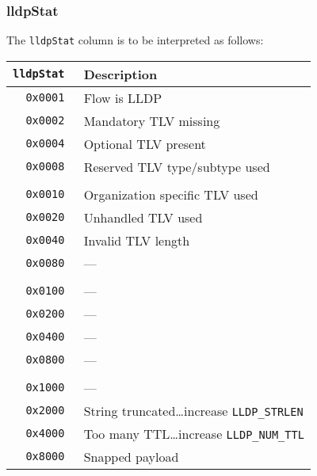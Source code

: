 \documentclass[documentation]{subfiles}
\begin{document}
\subsubsection{lldpStat}\label{lldpStat}
The {\tt lldpStat} column is to be interpreted as follows:
\begin{longtable}{>{\tt}rl}
    \toprule
    {\bf lldpStat} & {\bf Description}\\
    \midrule\endhead%
    0x0001 & Flow is LLDP\\
    0x0002 & Mandatory TLV missing\\
    0x0004 & Optional TLV present\\
    0x0008 & Reserved TLV type/subtype used\\
    \\
    0x0010 & Organization specific TLV used\\
    0x0020 & Unhandled TLV used\\
    0x0040 & Invalid TLV length\\
    0x0080 & ---\\
    \\
    0x0100 & ---\\
    0x0200 & ---\\
    0x0400 & ---\\
    0x0800 & ---\\
    \\
    0x1000 & ---\\
    0x2000 & String truncated\ldots increase {\tt LLDP\_STRLEN}\\
    0x4000 & Too many TTL\ldots increase {\tt LLDP\_NUM\_TTL}\\
    0x8000 & Snapped payload\\
    \bottomrule
\end{longtable}
\end{document}
